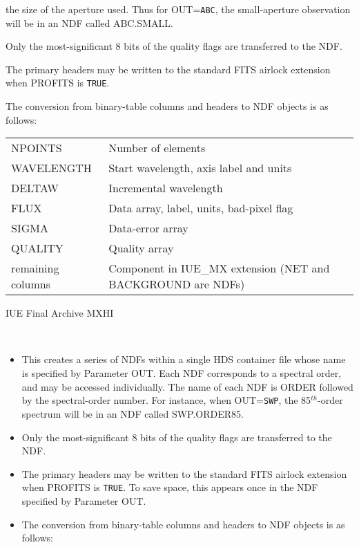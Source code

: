 \documentclass[twoside,11pt]{article}
\newcommand{\latex}[1]{#1}
\newcommand{\ssthitemlist}[1]{
  \latex{
  \mbox{} \\
  \vspace{-3.5ex}
  }
  \begin{itemize}
     #1
  \end{itemize}
}
\newcommand{\sstitem}{\item}
\newcommand{\sstitem}{\item}
\begin{document}
{{{{            the size of the aperture used.  Thus for OUT=\texttt{ABC}, the
            small-aperture observation will be in an NDF called ABC.SMALL.
            \sstitem
            Only the most-significant 8 bits of the quality flags are
            transferred to the NDF.
            \sstitem
            The primary headers may be written to the standard FITS
            airlock extension when PROFITS is \texttt{TRUE}.
            \sstitem
            The conversion from binary-table columns and headers to NDF
            objects is as follows:
            \\[\medskipamount]
            \begin{tabular}{lp{90mm}}
            NPOINTS            &   Number of elements \\
            WAVELENGTH         &   Start wavelength, axis label and units \\
            DELTAW             &   Incremental wavelength \\
            FLUX               &   Data array, label, units, bad-pixel flag \\
            SIGMA              &   Data-error array \\
            QUALITY            &   Quality array \\
            remaining columns  &   Component in IUE\_MX extension (NET and
                                   BACKGROUND are NDFs) \\
            \end{tabular}
         }
         \bigskip
         \sstitem
         IUE Final Archive MXHI
         \ssthitemlist{
            \sstitem
            This creates a series of NDFs within a single HDS container
            file whose name is specified by Parameter OUT.  Each NDF
            corresponds to a spectral order, and may be accessed individually.
            The name of each NDF is ORDER followed by the spectral-order
            number.  For instance, when OUT=\texttt{SWP}, the 85$^{th}$-order
            spectrum will be in an NDF called SWP.ORDER85.
            \sstitem
            Only the most-significant 8 bits of the quality flags are
            transferred to the NDF.
            \sstitem
            The primary headers may be written to the standard FITS
            airlock extension when PROFITS is \texttt{TRUE}.  To save space, this
            appears once in the NDF specified by Parameter OUT.
            \sstitem
            The conversion from binary-table columns and headers to NDF
            objects is as follows:
}}}}
\end{document}
